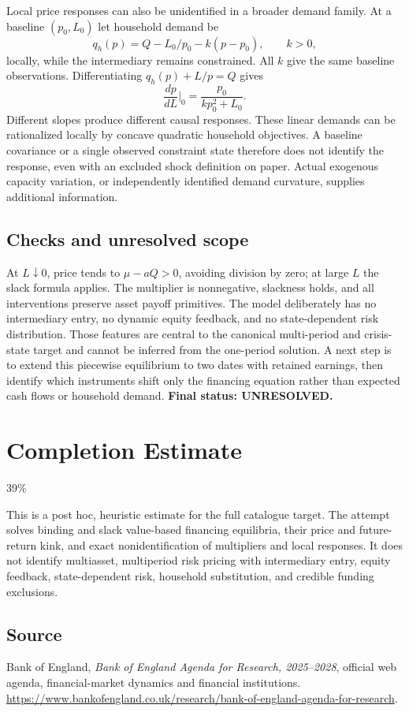 \documentclass[11pt]{article}
\begin{document}
Local price responses can also be unidentified in a broader demand family.
At a baseline $(p_0,L_0)$ let household demand be
\[
 q_h(p)=Q-L_0/p_0-k(p-p_0),\qquad k>0,
\]
locally, while the intermediary remains constrained. All $k$ give the same
baseline observations. Differentiating
$q_h(p)+L/p=Q$ gives
\[
 \frac{dp}{dL}\bigg|_0=\frac{p_0}{kp_0^2+L_0}.
\]
Different slopes produce different causal responses. These linear demands
can be rationalized locally by concave quadratic household objectives.
A baseline covariance or a single observed constraint state therefore does
not identify the response, even with an excluded shock definition on paper.
Actual exogenous capacity variation, or independently identified demand
curvature, supplies additional information.

\subsection*{Checks and unresolved scope}
At $L\downarrow0$, price tends to $\mu-aQ>0$, avoiding division by zero;
at large $L$ the slack formula applies. The multiplier is nonnegative,
slackness holds, and all interventions preserve asset payoff primitives.
The model deliberately has no intermediary entry, no dynamic equity
feedback, and no state-dependent risk distribution. Those features are
central to the canonical multi-period and crisis-state target and cannot
be inferred from the one-period solution. A next step is to extend this
piecewise equilibrium to two dates with retained earnings, then identify
which instruments shift only the financing equation rather than expected
cash flows or household demand. \textbf{Final status: UNRESOLVED.}

\section{Completion Estimate}
39\%

This is a post hoc, heuristic estimate for the full catalogue target.
The attempt solves binding and slack value-based financing equilibria, their price and future-return kink, and exact nonidentification of multipliers and local responses. It does not identify multiasset, multiperiod risk pricing with intermediary entry, equity feedback, state-dependent risk, household substitution, and credible funding exclusions.

\subsection*{Source}
Bank of England, \emph{Bank of England Agenda for Research, 2025--2028},
official web agenda, financial-market dynamics and financial institutions.
\url{https://www.bankofengland.co.uk/research/bank-of-england-agenda-for-research}.
\end{document}
